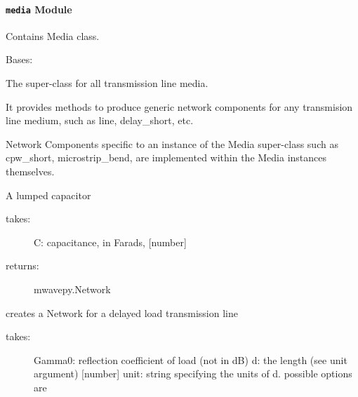 \documentclass[letterpaper,10pt,english]{sphinxmanual}
\begin{document}
\paragraph{\texttt{media} Module}
\label{api/mwavepy.media:media-module}\label{api/mwavepy.media:module-mwavepy.media.media}
Contains Media class.

\begin{fulllineitems}
\label{api/mwavepy.media:mwavepy.media.media.Media}
Bases: 

The super-class for all transmission line media.

It provides methods to produce generic network components for any
transmision line medium, such as line, delay\_short, etc.

Network Components specific to an instance of the Media super-class
such as cpw\_short, microstrip\_bend, are implemented within the 
Media instances themselves.

\begin{fulllineitems}
\label{api/mwavepy.media:mwavepy.media.media.Media.capacitor}
A lumped capacitor
\begin{description}
\item[{takes:}] \leavevmode
C: capacitance, in Farads, {[}number{]}

\item[{returns:}] \leavevmode
mwavepy.Network

\end{description}

\end{fulllineitems}


\begin{fulllineitems}
\label{api/mwavepy.media:mwavepy.media.media.Media.characteristic_impedance}
\end{fulllineitems}


\begin{fulllineitems}
\label{api/mwavepy.media:mwavepy.media.media.Media.delay_load}
creates a Network for a delayed load transmission line
\begin{description}
\item[{takes:}] \leavevmode
Gamma0: reflection coefficient of load (not in dB)
d: the length (see unit argument) {[}number{]}
unit: string specifying the units of d. possible options are
\begin{quote}


\end{quote}
\end{description}
\end{fulllineitems}
\end{fulllineitems}
\end{document}
